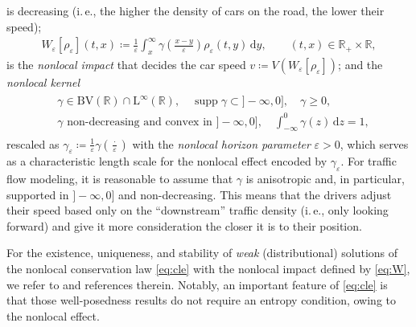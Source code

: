\documentclass[10pt]{amsart}
\theoremstyle{plain}
\theoremstyle{definition}
\numberwithin{equation}{section}
\newcommand{\R}{\mathbb{R}}
\newcommand{\eps}{{\varepsilon}}
\renewcommand{\d}{\mathrm{d}}
\newcommand{\dd}{\,\mathrm{d}}
\begin{document}
is decreasing (i.\,e., the higher the density of cars on the road,  the lower their speed); 
\begin{align}\label{eq:W} 
    W_{\eps}[\rho_\eps](t,x)\coloneqq\frac{1}{\eps}\int_{x}^{\infty} \gamma \left(\frac{x-y}{\eps}\right)\rho_\eps(t,y)\dd y , \qquad (t,x)\in \R_+ \times \R,
\end{align}
is the \emph{nonlocal impact} that decides the car speed $v\coloneqq V(W_{\eps}[\rho_\eps])$; and the \emph{nonlocal kernel} 
\begin{align}\label{ass:general-k}
\begin{aligned}
& \gamma \in \mathrm{BV}(\R) \cap \mathrm{L}^\infty(\R),  \quad \operatorname{supp}\gamma \subset ]-\infty,0], \quad  \gamma \ge 0, \\ & \gamma \text{ non-decreasing and convex in $]-\infty,0]$}, \quad \int_{-\infty}^0 \gamma(z) \, \d z = 1,
\end{aligned}
\end{align} 
rescaled as $\gamma_\eps \coloneqq \tfrac{1}{\varepsilon} \gamma\left(\tfrac{\cdot}{\eps}\right)$ with the  \emph{nonlocal horizon parameter} $\eps >0$, which serves as a characteristic length scale for the nonlocal effect encoded by $\gamma_\eps$. For traffic flow modeling, it is reasonable to assume that \(\gamma\) is anisotropic and, in particular, supported
in $]-\infty,0]$ and non-decreasing. This means that the drivers adjust their speed based only on the ``downstream'' traffic density (i.\,e., only looking forward) and give it more consideration the closer it is to their position.

For the existence, uniqueness, and stability of \textit{weak} (distributional) solutions of  the nonlocal conservation law \cref{eq:cle} with the nonlocal impact defined by \cref{eq:W}, we refer to \cite{zbMATH06756308,bressan2020traffic,zbMATH07615111} and references therein.  Notably, an important feature of \cref{eq:cle} is that those well-posedness results do not require an entropy condition, owing to the nonlocal effect.
\end{document}

